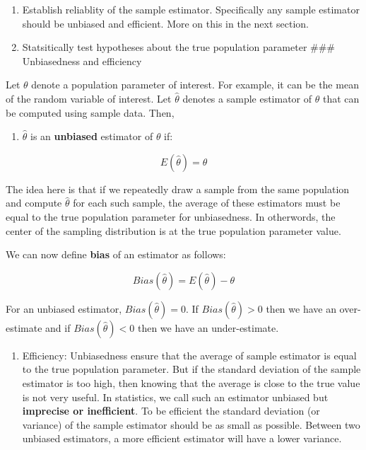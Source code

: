 \documentclass[]{book}
\providecommand{\tightlist}{%
  \setlength{\itemsep}{0pt}\setlength{\parskip}{0pt}}
\theoremstyle{definition}
\theoremstyle{definition}
\theoremstyle{definition}
\theoremstyle{remark}
\begin{document}
\begin{enumerate}
  \begin{enumerate}
  \def\labelenumii{\alph{enumii}.}
  \tightlist
  \item
    Establish reliablity of the sample estimator. Specifically any sample estimator should be unbiased and efficient. More on this in the next section.
  \item
    Statsitically test hypotheses about the true population parameter
    \#\#\# Unbiasedness and efficiency
  \end{enumerate}
\end{enumerate}

Let \(\theta\) denote a population parameter of interest. For example, it can be the mean of the random variable of interest. Let \(\widehat{\theta}\) denotes a sample estimator of \(\theta\) that can be computed using sample data. Then,

\begin{enumerate}
\def\labelenumi{\arabic{enumi}.}
\tightlist
\item
  \(\widehat{\theta}\) is an \textbf{unbiased} estimator of \(\theta\) if:
\end{enumerate}

\[E(\widehat{\theta})=\theta\]

The idea here is that if we repeatedly draw a sample from the same population and compute \(\widehat{\theta}\) for each such sample, the average of these estimators must be equal to the true population parameter for unbiasedness. In otherwords, the center of the sampling distribution is at the true population parameter value.

We can now define \textbf{bias} of an estimator as follows:

\[Bias(\widehat{\theta}) = E(\widehat{\theta})-\theta\]

For an unbiased estimator, \(Bias(\widehat{\theta})=0\). If \(Bias(\widehat{\theta})>0\) then we have an over-estimate and if \(Bias(\widehat{\theta})<0\) then we have an under-estimate.

\begin{enumerate}
\def\labelenumi{\arabic{enumi}.}
\setcounter{enumi}{1}
\tightlist
\item
  Efficiency: Unbiasedness ensure that the average of sample estimator is equal to the true population parameter. But if the standard deviation of the sample estimator is too high, then knowing that the average is close to the true value is not very useful. In statistics, we call such an estimator unbiased but \textbf{imprecise or inefficient}. To be efficient the standard deviation (or variance) of the sample estimator should be as small as possible. Between two unbiased estimators, a more efficient estimator will have a lower variance.
\end{enumerate}
\end{document}
